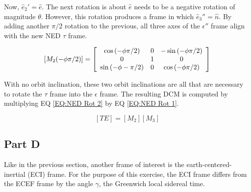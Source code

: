 \documentclass[]{aiaa-tc}%
\newcommand{\brackets} [1] {\left[ #1 \right]}
\newcommand{\arrayb}[2]{\brackets{ \begin{array}{#1}  #2 \end{array} } }
\begin{document}
Now, $\hat{e}_2' = \hat{e}$. The next rotation is about $\hat{e}$ needs to be a negative rotation of magnitude $\theta$. However, this rotation produces a frame in which $\hat{e}_3'' = \hat{n}$. By adding another $\pi/2$ rotation to the previous, all three axes of the $\epsilon''$ frame align with the new NED $\tau$ frame. 

\begin{equation}
	\label{EQ:NED Rot 2}
	[M_2(-\phi\pi/2)] = 
	\arrayb{c c c}{
		\cos{(-\phi\pi/2)} 	& 	0	&	-\sin{(-\phi\pi/2)}	\\
		0				&	1	& 				0	\\
		\sin{(-\phi-\pi/2)}	&	0	& 	\cos{(-\phi\pi/2)} 			
	}
\end{equation}

With no orbit inclination, these two orbit inclinations are all that are necessary to rotate the $\tau$ frame into the $\epsilon$ frame. The resulting DCM is computed by multiplying EQ \ref{EQ:NED Rot 2} by EQ \ref{EQ:NED Rot 1}.

\begin{equation}
	\label{EQ:NED DCM}
	[TE] = [M_2][M_3]%
\end{equation}


\subsection{Part D}
Like in the previous section, another frame of interest is the earth-centered-inertial (ECI) frame. For the purpose of this exercise, the ECI frame differs from the ECEF frame by the angle $\gamma$, the Greenwich local sidereal time. 
\end{document}

